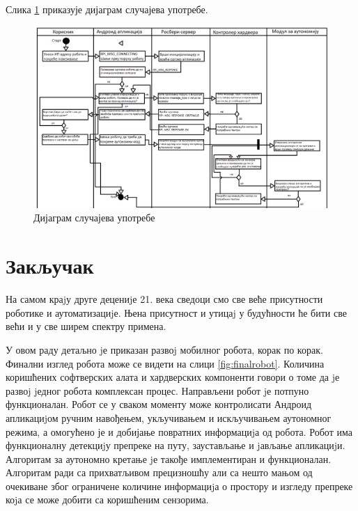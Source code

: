 \documentclass[12pt,oneside]{memoir}
\theoremstyle{remark}
\begin{document}
Слика \ref{fig:dijagramklasaapp} приказује дијаграм случајева употребе.

\begin{figure}[!ht]
\centering
\includegraphics[width=1.0\textwidth]{slike/aktvivnostidijagram.png}
\caption{Дијаграм случајева употребе }
\label{fig:dijagramklasaapp}
\end{figure}



\chapter{Закључак}
\label{chp:zakljucak}
На самом краjу друге децениjе 21. века сведоци смо све веће присутности роботике и аутоматизациjе. Њена присутност и утицаj у будућности ће бити све већи и у све ширем спектру примена. 

У овом раду детаљно jе приказан развоj мобилног робота, корак по корак. Финални изглед робота може се видети на слици \ref{fig:finalrobot}. Количина коришћених софтверских алата и хардверских компоненти говори о томе да jе развоj jедног робота комплексан процес. Направљени робот jе потпуно функционалан. Робот се у сваком моменту може контролисати Андроид апликациjом ручним навођењем, укључивањем и искључивањем аутономног режима, а омогућено је и добијање повратних информациjа од робота. Робот има функционалну детекциjу препреке на путу, заустављање и jављање апликациjи. Алгоритам за аутономно кретање jе такође имплементиран и функционалан. Алгоритам ради са прихватљивом прецизношћу али са нешто мањом од очекиване због ограничене количине информациjа о простору и изгледу препреке коjа се може добити са коришћеним сензорима.
\end{document}

